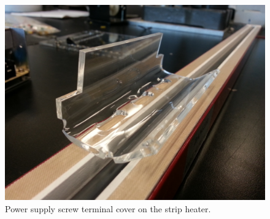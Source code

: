 \begin{figure}
    \centering
    \includegraphics[width=.8\linewidth]{figures/strip-heat}
    \caption{Power supply screw terminal cover on the strip heater.}
    \label{fig:strip-heat}
\end{figure}
